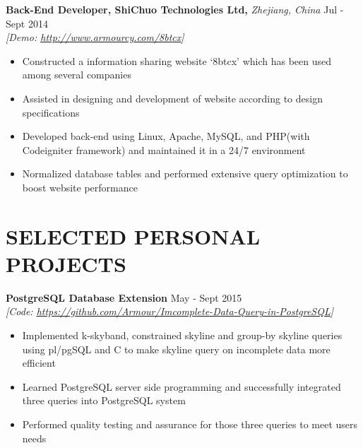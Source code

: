 \documentclass[11pt]{article} %
\begin{document}
\hspace{6mm}\textbf{Back-End Developer, ShiChuo Technologies Ltd,} \textit{Zhejiang, China} \hfill Jul - Sept 2014\\
\vspace{1mm}
\hspace{6mm}\textit{[Demo: \underline{\href{http://www.armourcy.com/8btcx}{http://www.armourcy.com/8btcx}}]}
\begin{itemize}[leftmargin=16mm]
		\item Constructed a information sharing website `8btcx' which has been used among several companies
		\vspace{-2mm}
		\item Assisted in designing and development of website according to design specifications
		\vspace{-2mm}
		\item Developed back-end using Linux, Apache, MySQL, and PHP(with Codeigniter framework) and maintained it in a 24/7 environment
		\vspace{-2mm}
		\item Normalized database tables and performed extensive query optimization to boost website performance
\end{itemize}


\section{SELECTED PERSONAL PROJECTS}

\hspace{6mm}\textbf{PostgreSQL Database Extension} \hfill May - Sept 2015\\
\vspace{1mm}
\hspace{6mm}\textit{[Code: \underline{\href{https://github.com/Armour/Imcomplete-Data-Query-in-PostgreSQL}{https://github.com/Armour/Imcomplete-Data-Query-in-PostgreSQL}}]}
\begin{itemize}[leftmargin=16mm]
        \item Implemented k-skyband, constrained skyline and group-by skyline queries using pl/pgSQL and C to make skyline query on incomplete data more efficient
		\vspace{-2mm}
        \item Learned PostgreSQL server side programming and successfully integrated three queries into PostgreSQL system
		\vspace{-2mm}
        \item Performed quality testing and assurance for those three queries to meet users needs
\end{itemize}
\end{document}
